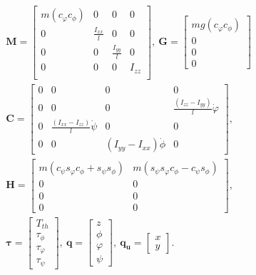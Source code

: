 \begin{align}
&\mathbf M =
\begin{bmatrix}
m(c_{\varphi}c_{\phi}) & 0 & 0 & 0 \\
0 & \frac{I_{xx}}{l} & 0 & 0\\
0 & 0 & \frac{I_{yy}}{l} & 0\\
0 & 0 & 0 & I_{zz}\\	
\end{bmatrix},~
\mathbf G = 
\begin{bmatrix}
mg(c_{\varphi}c_{\phi}) \\ 0 \\ 0 \\ 0
\end{bmatrix} \\
& \mathbf C = 
\begin{bmatrix}
0 & 0 & 0 & 0 \\ 
0 & 0 & 0 & \frac{(I_{zz} - I_{yy})}{l}\dot{\varphi}\\
0 & \frac{(I_{xx} - I_{zz})}{l}\dot{\psi} & 0 & 0 \\ 
0 & 0 & {(I_{yy} - I_{xx})}\dot{\phi}& 0
\end{bmatrix}	,\\
& \mathbf{H}=
\begin{bmatrix}
m(c_{\psi}s_{\varphi}c_{\phi} + s_{\psi}s_{\phi})  & m(s_{\psi}s_{\varphi}c_{\phi} - c_{\psi} s_{\phi}) \\ 
0 & 0\\
0 & 0 \\ 
0 & 0 
\end{bmatrix},\\
& \boldsymbol \tau = 
\begin{bmatrix}
T_{th} \\ \tau_\phi \\ \tau_\varphi \\ \tau_\psi
\end{bmatrix}, ~\mathbf q = 
\begin{bmatrix}
z \\ \phi \\ \varphi \\ \psi
\end{bmatrix},~\mathbf{q_u} = 
\begin{bmatrix}
x \\ y
\end{bmatrix}.
\end{align}


